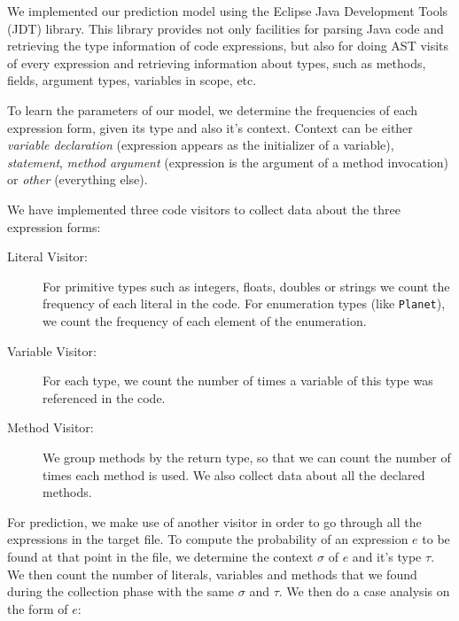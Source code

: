 \documentclass{article} %
\begin{document}
We implemented our prediction model using the Eclipse Java Development Tools (JDT) library. This library provides not only facilities for parsing Java code and retrieving the type information of code expressions, but also for doing AST visits of every expression and retrieving information about types, such as methods, fields, argument types, variables in scope, etc.

To learn the parameters of our model, we determine the frequencies of each expression form, given its type and also it's context.
Context can be either \textit{variable declaration} (expression appears as the initializer of a variable), \textit{statement}, \textit{method argument} (expression is the argument of a method invocation) or \textit{other} (everything else).

We have implemented three code visitors to collect data about the three expression forms:

\begin{description}
   \item[Literal Visitor:] For primitive types such as integers, floats, doubles or strings we count the frequency of each literal in the code. For enumeration types (like \texttt{Planet}), we count the frequency of each element of the enumeration.

   \item[Variable Visitor:] For each type, we count the number of times a variable of this type was referenced in the code.

   \item[Method Visitor:] We group methods by the return type, so that we can count the number of times each method is used. We also collect data about all the declared methods.
\end{description}

For prediction, we make use of another visitor in order to go through all the expressions in the target file. To compute the probability of an expression $e$ to be found at that point in the file, we determine the context $\sigma$ of $e$ and it's type $\tau$. We
then count the number of literals, variables and methods that we found during the collection phase with the same $\sigma$ and $\tau$. We then do a case analysis on the form of $e$:
\end{document}
